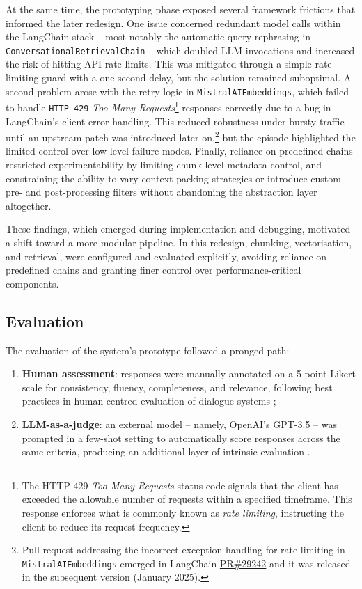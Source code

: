 \begin{spacing}{1.5}
At the same time, the prototyping phase exposed several framework frictions that informed the later redesign. One issue concerned redundant model calls within the LangChain stack -- most notably the automatic query rephrasing in \texttt{ConversationalRetrievalChain} -- which doubled LLM invocations and increased the risk of hitting API rate limits. This was mitigated through a simple rate-limiting guard with a one-second delay, but the solution remained suboptimal. A second problem arose with the retry logic in \texttt{MistralAIEmbeddings}, which failed to handle \texttt{HTTP 429} \textit{Too Many Requests}\footnote{The HTTP 429 \textit{Too Many Requests} status code signals that the client has exceeded the allowable number of requests within a specified timeframe. This response enforces what is commonly known as \textit{rate limiting}, instructing the client to reduce its request frequency.} responses correctly due to a bug in LangChain’s client error handling. This reduced robustness under bursty traffic until an upstream patch was introduced later on,\footnote{Pull request addressing the incorrect exception handling for rate limiting in \texttt{MistralAIEmbeddings} emerged in LangChain \href{https://web.archive.org/web/20250823161804/https://github.com/langchain-ai/langchain/pull/29242}{PR\#29242} and it was released in the subsequent version (January 2025).}\nocite{noauthor_mistralai_2025} but the episode highlighted the limited control over low-level failure modes. Finally, reliance on predefined chains restricted experimentability by limiting chunk-level metadata control, and constraining the ability to vary context-packing strategies or introduce custom pre- and post-processing filters without abandoning the abstraction layer altogether.

These findings, which emerged during implementation and debugging, motivated a shift toward a more modular pipeline. In this redesign, chunking, vectorisation, and retrieval, were configured and evaluated explicitly, avoiding reliance on predefined chains and granting finer control over performance-critical components.

\subsection{Evaluation}
The evaluation of the system's prototype followed a pronged path:
\begin{enumerate}
      \item \textbf{Human assessment}: responses were manually annotated on a 5-point Likert scale for consistency, fluency, completeness, and relevance, following best practices in human-centred evaluation of dialogue systems \citep{abeysinghe_challenges_2024,van_der_lee_human_2021};
      \item \textbf{LLM-as-a-judge}: an external model -- namely, OpenAI’s GPT-3.5 -- was prompted in a few-shot setting to automatically score responses across the same criteria, producing an additional layer of intrinsic evaluation \citep{svikhnushina_approximating_2023}.
\end{enumerate}


\end{spacing}
